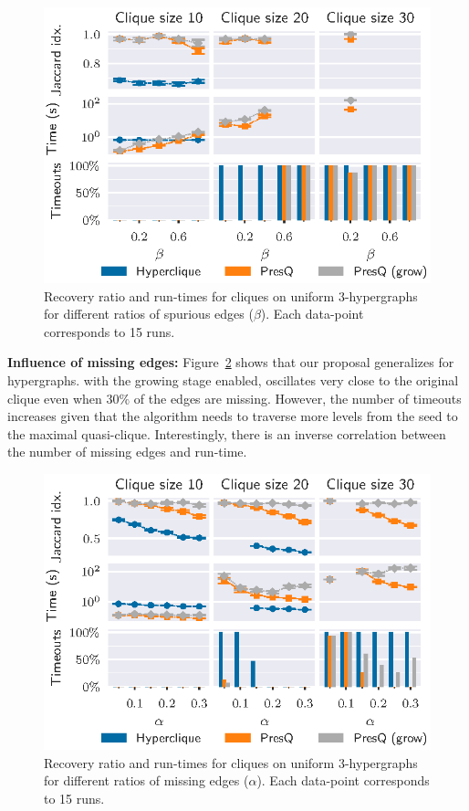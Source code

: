 \begin{figure}[ht]
    \centering
    \includegraphics{images/presq/3hyper_beta}
    \caption{Recovery ratio and run-times for cliques on uniform $3$-hypergraphs
    for different ratios of spurious edges ($\beta$).
    Each data-point corresponds to 15 runs.}
    \label{fig:3hyper_beta}
\end{figure}

\textbf{Influence of missing edges:}
Figure~\ref{fig:3hyper_alpha} shows that our proposal
generalizes for hypergraphs. \PresQ with the growing stage enabled, oscillates very close
to the original clique even when $30\%$ of the edges are missing. However, the number of
timeouts increases given that the algorithm needs to traverse more levels from the seed to the maximal
quasi-clique. Interestingly, there is an inverse correlation between the number
of missing edges and run-time.

\begin{figure}[ht]
    \centering
    \includegraphics{images/presq/3hyper_alpha}
    \caption{Recovery ratio and run-times for cliques on uniform $3$-hypergraphs
    for different ratios of missing edges ($\alpha$).
    Each data-point corresponds to 15 runs.}
    \label{fig:3hyper_alpha}
\end{figure}

